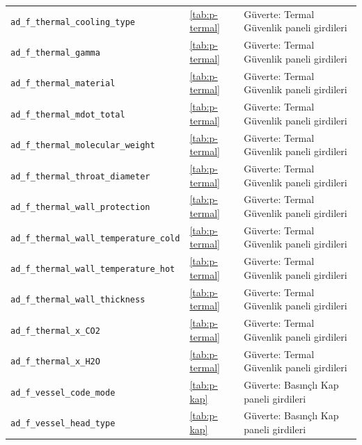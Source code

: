 \documentclass[11pt,a4paper]{article}
\begin{document}
{\begin{longtable}{@{}>{\raggedright\arraybackslash}p{5.2cm}p{1.4cm}>{\raggedright\arraybackslash}p{7.4cm}@{}}
\texttt{ad\_\allowbreak{}f\_\allowbreak{}thermal\_\allowbreak{}cooling\_\allowbreak{}type} & \ref{tab:p-termal} & Güverte: Termal Güvenlik paneli girdileri \\
\texttt{ad\_\allowbreak{}f\_\allowbreak{}thermal\_\allowbreak{}gamma} & \ref{tab:p-termal} & Güverte: Termal Güvenlik paneli girdileri \\
\texttt{ad\_\allowbreak{}f\_\allowbreak{}thermal\_\allowbreak{}material} & \ref{tab:p-termal} & Güverte: Termal Güvenlik paneli girdileri \\
\texttt{ad\_\allowbreak{}f\_\allowbreak{}thermal\_\allowbreak{}mdot\_\allowbreak{}total} & \ref{tab:p-termal} & Güverte: Termal Güvenlik paneli girdileri \\
\texttt{ad\_\allowbreak{}f\_\allowbreak{}thermal\_\allowbreak{}molecular\_\allowbreak{}weight} & \ref{tab:p-termal} & Güverte: Termal Güvenlik paneli girdileri \\
\texttt{ad\_\allowbreak{}f\_\allowbreak{}thermal\_\allowbreak{}throat\_\allowbreak{}diameter} & \ref{tab:p-termal} & Güverte: Termal Güvenlik paneli girdileri \\
\texttt{ad\_\allowbreak{}f\_\allowbreak{}thermal\_\allowbreak{}wall\_\allowbreak{}protection} & \ref{tab:p-termal} & Güverte: Termal Güvenlik paneli girdileri \\
\texttt{ad\_\allowbreak{}f\_\allowbreak{}thermal\_\allowbreak{}wall\_\allowbreak{}temperature\_\allowbreak{}cold} & \ref{tab:p-termal} & Güverte: Termal Güvenlik paneli girdileri \\
\texttt{ad\_\allowbreak{}f\_\allowbreak{}thermal\_\allowbreak{}wall\_\allowbreak{}temperature\_\allowbreak{}hot} & \ref{tab:p-termal} & Güverte: Termal Güvenlik paneli girdileri \\
\texttt{ad\_\allowbreak{}f\_\allowbreak{}thermal\_\allowbreak{}wall\_\allowbreak{}thickness} & \ref{tab:p-termal} & Güverte: Termal Güvenlik paneli girdileri \\
\texttt{ad\_\allowbreak{}f\_\allowbreak{}thermal\_\allowbreak{}x\_\allowbreak{}CO2} & \ref{tab:p-termal} & Güverte: Termal Güvenlik paneli girdileri \\
\texttt{ad\_\allowbreak{}f\_\allowbreak{}thermal\_\allowbreak{}x\_\allowbreak{}H2O} & \ref{tab:p-termal} & Güverte: Termal Güvenlik paneli girdileri \\
\texttt{ad\_\allowbreak{}f\_\allowbreak{}vessel\_\allowbreak{}code\_\allowbreak{}mode} & \ref{tab:p-kap} & Güverte: Basınçlı Kap paneli girdileri \\
\texttt{ad\_\allowbreak{}f\_\allowbreak{}vessel\_\allowbreak{}head\_\allowbreak{}type} & \ref{tab:p-kap} & Güverte: Basınçlı Kap paneli girdileri \\

\end{longtable}}
\end{document}
